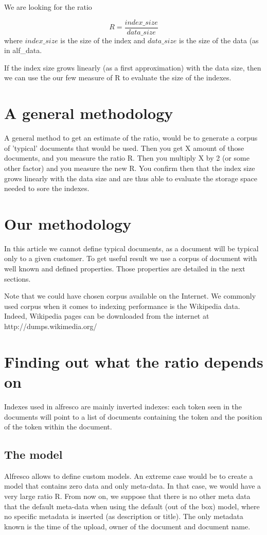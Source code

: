 \documentclass[12pt,a4]{article}
\begin{document}
We are looking for the ratio

\begin{equation}
R=\frac{index\_size}{data\_size}
\end{equation}
where $index\_size$ is the size of the index and $data\_size$ is the size of the data (as in alf\_data.

If the index size grows linearly (as a first approximation) with the data size, then we can use the our few measure of R to evaluate the size of the indexes.

\section{A general methodology}
A general method to get an estimate of the ratio, would be to generate a corpus of 'typical' documents that would be used.
Then you get X amount of those documents, and you measure the ratio R.
Then you multiply X by 2 (or some other factor) and you measure the new R.
You confirm then that the index size grows linearly with the data size and are thus able to evaluate the storage space needed to sore the indexes.

\section{Our methodology}
In this article we cannot define typical documents, as a document will be typical only to a given customer.
To get useful result we use a corpus of document with well known and defined properties.
Those properties are detailed in the next sections.

Note that we could have chosen corpus available on the Internet. We commonly used corpus when it comes to indexing performance is the Wikipedia data. Indeed, Wikipedia pages can be downloaded from the internet at http://dumps.wikimedia.org/




\section{Finding out what the ratio depends on}
Indexes used in alfresco are mainly inverted indexes: each token seen in the documents will point to a list of documents containing the token and the position of the token within the document.

\subsection{The model}
Alfresco allows to define custom models.
An extreme case would be to create a model that contains zero data and only meta-data.
In that case, we would have a very large ratio R.
From now on, we suppose that there is no other meta data that the default meta-data when using the default (out of the box) model, where no specific metadata is inserted (as description or title). The only metadata known is the time of the upload, owner of the document and document name.
 
\end{document}
